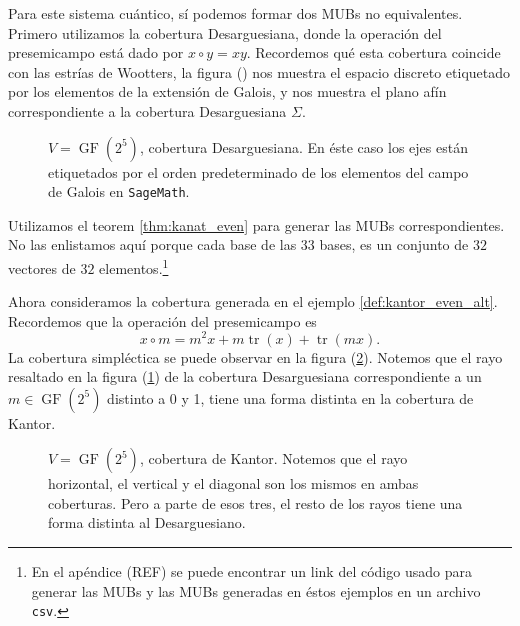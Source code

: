 \documentclass[a4paper]{report}
\DeclareMathOperator{\tr}{tr}
\DeclareMathOperator{\GF}{GF}
\begin{document}
  Para este sistema cuántico, sí podemos formar dos MUBs no
  equivalentes. Primero utilizamos la cobertura
  Desarguesiana, donde la operación del presemicampo está
  dado por $x \circ y = xy$.  Recordemos qué esta cobertura
  coincide con las estrías de Wootters, la figura () nos
  muestra el espacio discreto etiquetado por los elementos
  de la extensión de Galois, y nos muestra el plano afín
  correspondiente a la cobertura Desarguesiana $\Sigma$.
  \begin{figure}[ht]
    \centering
    
    \caption{$V = \GF(2^{5})$, cobertura Desarguesiana. En éste
    caso los ejes están etiquetados por el orden
    predeterminado de los elementos del campo de Galois en
    \texttt{SageMath}.}
    \label{fig:2-5-desargues-plane}
  \end{figure}
  Utilizamos el teorem \ref{thm:kanat_even} para
  generar las MUBs correspondientes. No las enlistamos aquí
  porque cada base de las $33$ bases, es un conjunto de $32$ 
  vectores de $32$ elementos.\footnote{En el apéndice (REF)
  se puede encontrar un link del código usado para generar
  las MUBs y las MUBs generadas en éstos ejemplos en un
  archivo \texttt{csv}.}

  Ahora consideramos la cobertura generada en el ejemplo
  \ref{def:kantor_even_alt}. Recordemos que la operación del
  presemicampo es
  \begin{equation}
    \label{eqn:kantor_presemi}
    x \circ m
    = m^2 x + m \tr(x) + \tr(mx).
  \end{equation} 
  La cobertura simpléctica se puede observar en la figura
  (\ref{fig:2-5-kantor-plane}).  Notemos que el rayo
  resaltado en la figura (\ref{fig:2-5-desargues-plane}) de
  la cobertura Desarguesiana correspondiente a un $m \in
  \GF(2^{5})$ distinto a 0 y 1, tiene una forma distinta en
  la cobertura de Kantor.
  \begin{figure}[ht]
    \centering
    
    \caption{$V = \GF(2^{5})$, cobertura de Kantor. Notemos
      que el rayo horizontal, el vertical y el diagonal son
      los mismos en ambas coberturas. Pero a parte de esos
      tres, el resto de los rayos tiene una forma distinta
      al Desarguesiano.}
    \label{fig:2-5-kantor-plane}
  \end{figure}
  
\end{document}
